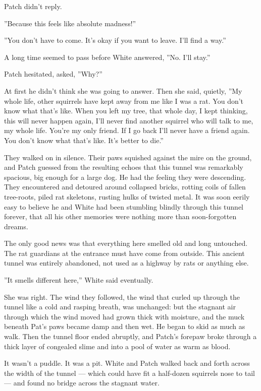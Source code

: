 \documentclass[12pt]{book}
\begin{document}
Patch didn't reply.

''Because this feels like absolute madness!''

''You don't have to come. It's okay if you want to leave. I'll find a
way.''

A long time seemed to pass before White answered, ''No. I'll stay.''

Patch hesitated, asked, ''Why?''

At first he didn't think she was going to answer. Then she said,
quietly, ''My whole life, other squirrels have kept away from me like
I was a rat. You don't know what that's like. When you left my tree,
that whole day, I kept thinking, this will never happen again, I'll
never find another squirrel who will talk to me, my whole life. You're
my only friend. If I go back I'll never have a friend again. You don't
know what that's like. It's better to die.''

They walked on in silence. Their paws squished against the mire on the
ground, and Patch guessed from the resulting echoes that this tunnel
was remarkably spacious, big enough for a large dog. He had the
feeling they were descending. They encountered and detoured around
collapsed bricks, rotting coils of fallen tree-roots, piled rat
skeletons, rusting hulks of twisted metal. It was soon eerily easy to
believe he and White had been stumbling blindly through this tunnel
forever, that all his other memories were nothing more than
soon-forgotten dreams.

The only good news was that everything here smelled old and long
untouched. The rat guardians at the entrance must have come from
outside. This ancient tunnel was entirely abandoned, not used as a
highway by rats or anything else.

''It smells different here,'' White said eventually.

She was right. The wind they followed, the wind that curled up through
the tunnel like a cold and rasping breath, was unchanged: but the
stagnant air through which the wind moved had grown thick with
moisture, and the muck beneath Pat's paws became damp and then wet. He
began to skid as much as walk. Then the tunnel floor ended abruptly,
and Patch's forepaw broke through a thick layer of congealed slime and
into a pool of water as warm as blood.

It wasn't a puddle. It was a pit. White and Patch walked back and
forth across the width of the tunnel --- which could have fit a
half-dozen squirrels nose to tail --- and found no bridge across the
stagnant water.
\end{document}
